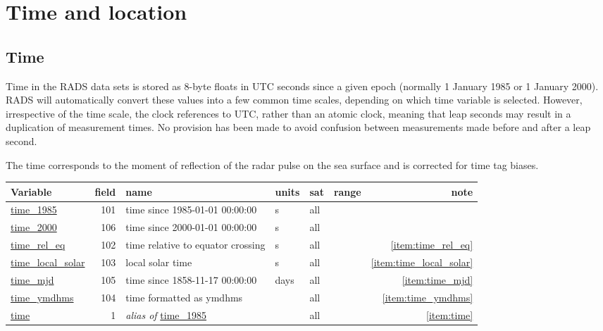 \documentclass[a4paper,11pt,openany,natbib,nomargin]{thesis}
\makeatletter
\newcommand\var[1]{\url{#1}\index{variables!#1@\protect\url{#1}}}
\newcommand\alias[1]{\emph{alias of} \var{#1}}
\newenvironment{vartable}{
\begin{table}[ht]
\small
\begin{tabular}{lrllllr}
\hline
Variable & field & name & units & sat & range & note \\
\hline
}{
\hline
\end{tabular}
\end{table}
}
\makeatother
\begin{document}
\chapter{Time and location}
\label{ch:time and location}

\section{Time}
\label{var:time}
Time in the RADS data sets is stored as 8-byte floats in UTC seconds since a given epoch (normally 1 January 1985 or 1 January 2000). RADS will automatically convert these values into a few common time scales, depending on which time variable is selected.
However, irrespective of the time scale, the clock references to UTC, rather than an atomic clock, meaning that leap seconds may result in a duplication of measurement times. No provision has been made to avoid confusion between measurements made before and after a leap second.

The time corresponds to the moment of reflection of the radar pulse on the sea surface and is corrected for time tag biases.

\begin{vartable}
\var{time_1985} & 101 & time since 1985-01-01 00:00:00 & s & all & & \\
\var{time_2000} & 106 & time since 2000-01-01 00:00:00 & s & all & & \\
\var{time_rel_eq} & 102 & time relative to equator crossing & s & all & & \ref{item:time_rel_eq} \\
\var{time_local_solar} & 103 & local solar time & s & all & & \ref{item:time_local_solar} \\
\var{time_mjd} & 105 & time since 1858-11-17 00:00:00 & days & all & & \ref{item:time_mjd} \\
\var{time_ymdhms} & 104 & time formatted as ymdhms &  & all & & \ref{item:time_ymdhms} \\
\hline
\var{time} & 1 & \alias{time_1985} & & all & & \ref{item:time} \\
\end{vartable}
\end{document}

